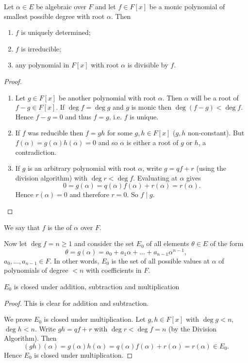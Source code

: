 \begin{proposition}
	Let $\alpha \in E$ be algebraic over $F$ and let $f \in F[x]$ be a monic polynomial of smallest possible degree with root $\alpha$. Then
	\begin{enumerate}
		\item $f$ is uniquely determined;
		\item $f$ is irreducible;
		\item any polynomial in $F[x]$ with root $\alpha$ is divisible by $f$.
	\end{enumerate}
	\begin{proof}\hfill
		\begin{enumerate}
			\item Let $g \in F[x]$ be another polynomial with root $\alpha$. Then $\alpha$ will be a root of $f - g \in F[x]$. If $\deg{f} = \deg{g}$ and $g$ is monic then $\deg(f - g) < \deg{f}$. Hence $f - g = 0$ and thus $f = g$, i.e. $f$ is unique.
			\item If $f$ was reducible then $f = gh$ for some $g, h \in F[x]$ ($g, h$ non-constant). But $f(\alpha) = g(\alpha)h(\alpha) = 0$ and so $\alpha$ is either a root of $g$ or $h$, a contradiction.
			\item If $g$ is an arbitrary polynomial with root $\alpha$, write $g = qf + r$ (using the division algorithm) with $\deg{r} < \deg{f}$. Evaluating at $\alpha$ gives
			\[
				0 = g(\alpha) = q(\alpha)f(\alpha) + r(\alpha) = r(\alpha).
			\]
			Hence $r(\alpha) = 0$ and therefore $r = 0$. So $f \mid g$.
		\end{enumerate}
	\end{proof}
\end{proposition}

We say that $f$ is the  of $\alpha$ over $F$.

Now let $\deg{f} = n \geq 1$ and consider the set $E_0$ of all elements $\theta
\in E$ of the form
\[
	\theta = g(\alpha) = a_0 + a_1 \alpha + \dots + a_{n - 1} \alpha^{n - 1},
\]
$a_0, \dots, a_{n - 1} \in F$. In other words, $E_0$ is the set of all 
possible values at $\alpha$ of polynomials of degree $< n$ with coefficients in
 $F$.

\begin{proposition}
	$E_0$ is closed under addition, subtraction and multiplication
	\begin{proof}
		This is clear for addition and subtraction.
		
		We prove $E_0$ is closed under multiplication. Let $g, h \in F[x]$ with $\deg{g} < n$, $\deg{h} < n$. Write $gh = qf + r$ with $\deg{r} < \deg{f} = n$ (by the Division Algorithm). Then
		\[
			(gh)(\alpha) = g(\alpha)h(\alpha) = q(\alpha)f(\alpha) + r(\alpha) = r(\alpha) \in E_0.
		\]
		Hence $E_0$ is closed under multiplication.
	\end{proof}
\end{proposition}

